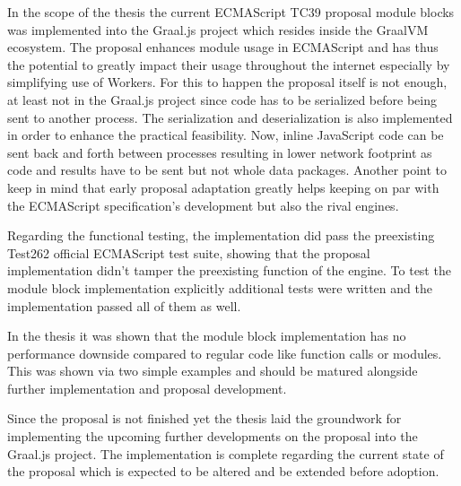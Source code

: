 
In the scope of the thesis the current ECMAScript TC39 proposal module blocks was implemented into the Graal.js project which resides inside the GraalVM ecosystem. The proposal enhances module usage in ECMAScript and has thus the potential to greatly impact their usage throughout the internet especially by simplifying use of Workers. For this to happen the proposal itself is not enough, at least not in the Graal.js project since code has to be serialized before being sent to another process. The serialization and deserialization is also implemented in order to enhance the practical feasibility. Now, inline JavaScript code can be sent back and forth between processes resulting in lower network footprint as code and results have to be sent but not whole data packages. Another point to keep in mind that early proposal adaptation greatly helps keeping on par with the ECMAScript specification's development but also the rival engines. 

Regarding the functional testing, the implementation did pass the preexisting Test262 official ECMAScript test suite, showing that the proposal implementation didn't tamper the preexisting function of the engine. To test the module block implementation explicitly additional tests were written and the implementation passed all of them as well.

In the thesis it was shown that the module block implementation has no performance downside compared to regular code like function calls or modules. This was shown via two simple examples and should be matured alongside further implementation and proposal development. 

Since the proposal is not finished yet the thesis laid the groundwork for implementing the upcoming further developments on the proposal into the Graal.js project. The implementation is complete regarding the current state of the proposal which is expected to be altered and be extended before adoption.